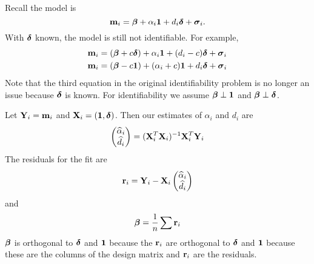\documentclass[12pt]{article}
\newcommand{\V}[1]{{\bm{\mathbf{\MakeLowercase{#1}}}}} %
\newcommand{\M}[1]{{\bm{\mathbf{\MakeUppercase{#1}}}}} %
\begin{document}
%
%
Recall the model is
\begin{equation*}
\V{m}_i = \V{\beta} + \alpha_i \V{1} + d_i \V{\delta} + \V{\sigma}_i.
\end{equation*}
With $\V{\delta}$ known, the model is still not identifiable. For example,
\begin{align*}
\V{m}_i &= (\V{\beta} + c\V{\delta}) + \alpha_i \V{1} + (d_i - c) \V{\delta} + \V{\sigma}_i\\
\V{m}_i &= (\V{\beta} - c\V{1}) + (\alpha_i + c)\V{1} + d_i\V{\delta} + \V{\sigma}_i\\
\end{align*}
Note that the third equation in the original identifiability problem is no longer an issue because $\V{\delta}$ is known. For identifiability we assume $\V{\beta} \perp \V{1}$ and $\V{\beta} \perp \V{\delta}$.

Let $\M{Y}_i=\V{m}_i$ and $\M{X}_i = (\V{1},\V{\delta})$. Then our estimates of $\alpha_i$ and $d_i$ are
\begin{equation*}
\begin{pmatrix}
\widehat{\alpha}_i \\\widehat{d}_i
\end{pmatrix}
 = (\M{X}_i^T\M{X}_i)^{-1}\M{X}_i^T\M{Y}_i
\end{equation*}
The residuals for the fit are
\begin{equation*}
\V{r}_i = \M{Y}_i - \M{X}_i\begin{pmatrix}
\widehat{\alpha}_i \\\widehat{d}_i
\end{pmatrix}
\end{equation*}
and 
\begin{equation*}
\V{\beta} = \frac{1}{n}\sum \V{r}_i
\end{equation*}
$\V{\beta}$ is orthogonal to $\V{\delta}$ and $\V{1}$ because the $\V{r}_i$ are orthogonal to $\V{\delta}$ and $\V{1}$ because these are the columns of the design matrix and $\V{r}_i$ are the residuals.
\end{document}
